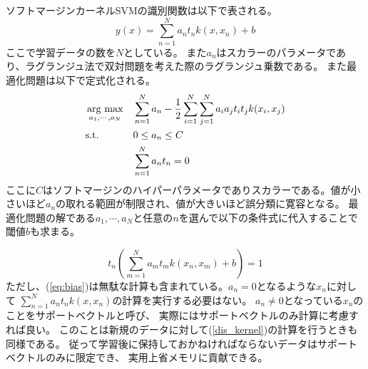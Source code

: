 ソフトマージンカーネルSVMの識別関数は以下で表される。
\begin{equation}
    y(x) = \sum_{n=1}^Na_nt_nk(x,x_n) + b
    \label{dis_kernel}
\end{equation}
ここで学習データの数を\(N\)としている。
また\(a_n\)はスカラーのパラメータであり、ラグランジュ法で双対問題を考えた際のラグランジュ乗数である。
また最適化問題は以下で定式化される\cite{PRMLSVM}。
\begin{equation}
    \begin{aligned}
    & \mathop{\rm arg~max}\limits_{a_1,\cdots,a_N}
    & & \sum_{n=1}^N a_n - \frac{1}{2}\sum_{i=1}^N \sum_{j=1}^N a_ia_jt_it_jk(x_i,x_j) \\
    & \text{s.t.}
    & & 0 \leq a_n \leq C  \\
    & & &  \sum_{n=1}^N a_nt_n=0
    \end{aligned}
    \label{eq:kernel SVM}
\end{equation}
ここに\(C\)はソフトマージンのハイパーパラメータでありスカラーである。値が小さいほど\(a_n\)の取れる範囲が制限され、値が大きいほど誤分類に寛容となる。
最適化問題の解である\(a_1,\cdots,a_N\)と任意の\(n\)を選んで以下の条件式に代入することで閾値\(b\)も求まる。

\begin{equation}
    t_n\left( \sum_{m=1}^Na_mt_mk(x_n,x_m) + b \right)=1
    \label{eq:bias}
\end{equation}
ただし、(\ref{eq:bias})は無駄な計算も含まれている。\(a_n=0\)となるような\(x_n\)に対して
\(\sum_{n=1}^Na_nt_nk(x,x_n)\)の計算を実行する必要はない。
\(a_n\neq0\)となっている\(x_n\)のことをサポートベクトルと呼び、
実際にはサポートベクトルのみ計算に考慮すれば良い。
このことは新規のデータに対して(\ref{dis_kernel})の計算を行うときも同様である。
従って学習後に保持しておかねければならないデータはサポートベクトルのみに限定でき、
実用上省メモリに貢献できる。

